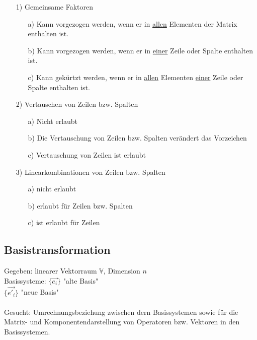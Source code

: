 \documentclass{article}
\begin{document}
\begin{itemize}
    \item[1)] Gemeinsame Faktoren
    \begin{itemize}
        \item[a)] Kann vorgezogen werden, wenn er in \underline{allen} Elementen der Matrix enthalten ist.
        \item[b)] Kann vorgezogen werden, wenn er in \underline{einer} Zeile oder Spalte enthalten ist.
        \item[c)] Kann gekürtzt werden, wenn er in \underline{allen} Elementen \underline{einer} Zeile oder Spalte enthalten ist.
    \end{itemize}
    \item[2)] Vertauschen von Zeilen bzw. Spalten
    \begin{itemize}
        \item[a)] Nicht erlaubt
        \item[b)] Die Vertauschung von Zeilen bzw. Spalten verändert das Vorzeichen
        \item[c)] Vertauschung von Zeilen ist erlaubt
    \end{itemize}
    \item[3)] Linearkombinationen von Zeilen bzw. Spalten
    \begin{itemize}
        \item[a)] nicht erlaubt
        \item[b)] erlaubt für Zeilen bzw. Spalten
        \item[c)] ist erlaubt für Zeilen 
    \end{itemize}
\end{itemize}

\subsection{Basistransformation}
Gegeben: linearer Vektorraum $\mathbb{V}$, Dimension $n$\\
Basissysteme: $\{ \vec{e_i} \}$ "alte Basis"\\
\hspace*{1cm} $\{ \vec{e'_i} \}$ "neue Basis"\\\\
Gesucht: Umrechnungsbeziehung zwischen dern Basissystemen sowie für die Matrix- und Komponentendarstellung von Operatoren bzw. Vektoren in den Basissystemen.
\end{document}
